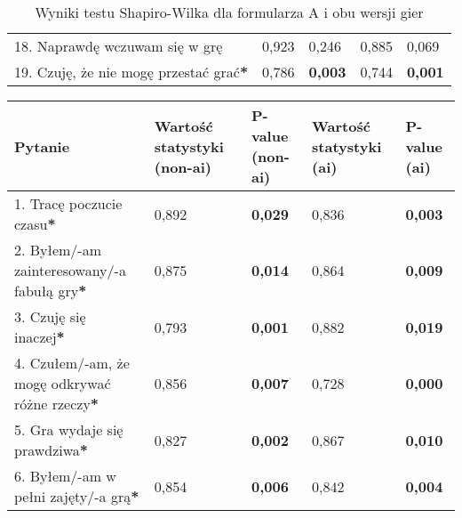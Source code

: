 \begin{table}[!h]
\begin{center}
\begin{tabular}{|m{10em}|m{5em}|m{5em}|m{5em}|m{5em}|}
            18. Naprawdę wczuwam się w grę                                              & 0,923                             & 0,246                  & 0,885                         & 0,069              \\
            19. Czuję, że nie mogę przestać grać\textbf{*}                              & 0,786                             & \textbf{0,003}         & 0,744                         & \textbf{0,001}     \\
            \hline
        \end{tabular}
    \end{center}
    \caption{Wyniki testu Shapiro-Wilka dla formularza A i obu wersji gier}\label{tab1:ch7_10}
\end{table}

\begin{table}[!h]
    \begin{center}
        \begin{tabular}{|m{10em}|m{5em}|m{5em}|m{5em}|m{5em}|}
            \hline
            Pytanie                                                                     & Wartość statystyki (non-\gls{ai}) & P-value (non-\gls{ai}) & Wartość statystyki (\gls{ai}) & P-value (\gls{ai}) \\
            \hline
            1. Tracę poczucie czasu\textbf{*}                                           & 0,892                             & \textbf{0,029}         & 0,836                         & \textbf{0,003}     \\
            2. Byłem/-am \newline zainteresowany/-a fabułą gry\textbf{*}                & 0,875                             & \textbf{0,014}         & 0,864                         & \textbf{0,009}     \\
            3. Czuję się inaczej\textbf{*}                                              & 0,793                             & \textbf{0,001}         & 0,882                         & \textbf{0,019}     \\
            4. Czułem/-am, że mogę odkrywać różne rzeczy\textbf{*}                      & 0,856                             & \textbf{0,007}         & 0,728                         & \textbf{0,000}     \\
            5. Gra wydaje się prawdziwa\textbf{*}                                       & 0,827                             & \textbf{0,002}         & 0,867                         & \textbf{0,010}     \\
            6. Byłem/-am \newline w pełni zajęty/-a grą\textbf{*}                       & 0,854                             & \textbf{0,006}         & 0,842                         & \textbf{0,004}     \\

\end{tabular}
\end{center}
\end{table}

